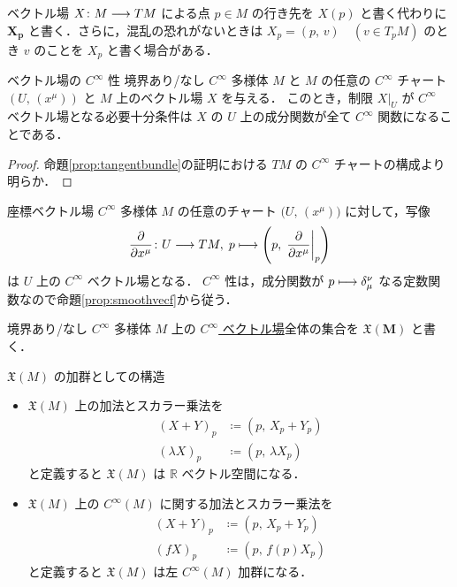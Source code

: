 \documentclass[TQFT_main]{subfiles}
\begin{document}
\begin{marker}
    ベクトル場 $X \colon M \longrightarrow TM$ による点 $ p\in M$ の行き先を $X(p)$ と書く代わりに $\bm{X_p}$ と書く．さらに，混乱の恐れがないときは $X_p = (p,\, v)\quad (v \in T_p M)$ のとき $v$ のことを $X_p$ と書く場合がある．
\end{marker}


\begin{myprop}[label=prop:smoothvecf]{ベクトル場の $C^\infty$ 性}
    境界あり/なし $C^\infty$ 多様体 $M$ と $M$ の任意の $C^\infty$ チャート $(U,\, (x^\mu))$ と $M$ 上のベクトル場 $X$ を与える．
    このとき，制限 $X|_U$ が $C^\infty$ ベクトル場となる必要十分条件は $X$ の $U$ 上の成分関数が全て $C^\infty$ 関数になることである．
\end{myprop}

\begin{proof}
    命題\ref{prop:tangentbundle}の証明における $TM$ の $C^\infty$ チャートの構成より明らか．
\end{proof}

\begin{myexample}[label=def:coord-vecf]{座標ベクトル場}
    $C^\infty$ 多様体 $M$ の任意のチャート $\bigl( U,\, (x^\mu) \bigr)$ に対して，写像
    \begin{align}
        \pdv{}{x^\mu} \colon U \lto TM,\; p \lmto \left(p,\, \eval{\pdv{}{x^\mu}}_p\right)
    \end{align}
    は $U$ 上の $C^\infty$ ベクトル場となる．
    $C^\infty$ 性は，成分関数が $p \longmapsto \delta^\nu_\mu$ なる定数関数なので命題\ref{prop:smoothvecf}から従う．
\end{myexample}

境界あり/なし $C^\infty$ 多様体 $M$ 上の \underline{$C^\infty$ ベクトル場}全体の集合を $\bm{\mathfrak{X}(M)}$ と書く．

\begin{myprop}[label=prop:vecf-module]{$\mathfrak{X}(M)$ の加群としての構造}
    \begin{itemize}
        \item $\mathfrak{X}(M)$ 上の加法とスカラー乗法を
        \begin{align}
            (X + Y)_p &\coloneqq (p,\, X_p + Y_p) \\
            (\lambda X)_p &\coloneqq (p,\, \lambda X_p)
        \end{align}
        と定義すると $\mathfrak{X}(M)$ は $\mathbb{R}$ ベクトル空間になる．
        \item $\mathfrak{X}(M)$ 上の $C^\infty (M)$ に関する加法とスカラー乗法を
        \begin{align}
            (X + Y)_p &\coloneqq (p,\, X_p + Y_p) \\
            (f X)_p &\coloneqq (p,\, f(p) X_p)
        \end{align}
        と定義すると $\mathfrak{X}(M)$ は左 $C^\infty (M)$ 加群になる．
    \end{itemize}
\end{myprop}
\end{document}
